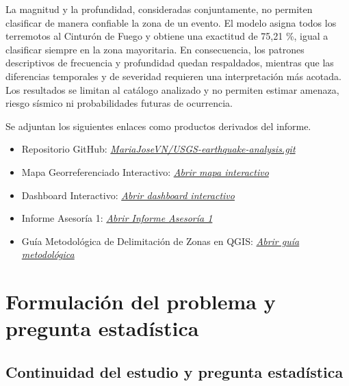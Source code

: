 \documentclass[
  spanish,
  letterpaper,
  DIV=11,
  numbers=noendperiod]{scrartcl}
\providecommand{\tightlist}{%
  \setlength{\itemsep}{0pt}\setlength{\parskip}{0pt}}
\newcommand{\asesoriaExternalLink}[2]{%
  {\hypersetup{urlcolor=asesoriaLinkColor}\href{#1}{\textcolor{asesoriaLinkColor}{\emph{#2}}}}%
}
\begin{document}
La magnitud y la profundidad, consideradas conjuntamente, no permiten
clasificar de manera confiable la zona de un evento. El modelo asigna
todos los terremotos al Cinturón de Fuego y obtiene una exactitud de
75,21 \%, igual a clasificar siempre en la zona mayoritaria. En
consecuencia, los patrones descriptivos de frecuencia y profundidad
quedan respaldados, mientras que las diferencias temporales y de
severidad requieren una interpretación más acotada. Los resultados se
limitan al catálogo analizado y no permiten estimar amenaza, riesgo
sísmico ni probabilidades futuras de ocurrencia.

Se adjuntan los siguientes enlaces como productos derivados del informe.

\begin{itemize}
\tightlist
\item
  Repositorio GitHub:
  \asesoriaExternalLink{https://github.com/MariaJoseVN/USGS-earthquake-analysis.git}{MariaJoseVN/USGS-earthquake-analysis.git}
\item
  Mapa Georreferenciado Interactivo:
  \asesoriaExternalLink{https://mariajosevn.github.io/USGS-earthquake-analysis/MAPA_HTML/mapa_interactivo_sismos_v2.html}{Abrir mapa interactivo}
\item
  Dashboard Interactivo:
  \asesoriaExternalLink{https://mariajosevn.github.io/USGS-earthquake-analysis/Dashboard/dashboard.html}{Abrir dashboard interactivo}
\item
  Informe Asesoría 1:
  \asesoriaExternalLink{https://mariajosevn.github.io/USGS-earthquake-analysis/Informes\%20Quarto/Informe\%20Asesor\%C3\%ADa\%201/Informe\%20Asesor\%C3\%ADa\%201\%20-\%20Actual.pdf}{Abrir Informe Asesoría 1}
\item
  Guía Metodológica de Delimitación de Zonas en QGIS:
  \asesoriaExternalLink{https://mariajosevn.github.io/USGS-earthquake-analysis/MAPA\_HTML/Gu\%C3\%ADa\%20metodol\%C3\%B3gica\%20para\%20la\%20delimitaci\%C3\%B3n\%20de\%20zonas\%20s\%C3\%ADsmicas\%20globales\%20en\%20QGIS.pdf}{Abrir guía metodológica}
\end{itemize}

\section{Formulación del problema y pregunta
estadística}\label{formulaciuxf3n-del-problema-y-pregunta-estaduxedstica}

\subsection{Continuidad del estudio y pregunta
estadística}\label{sec-sintesis-informe-1}
\end{document}
